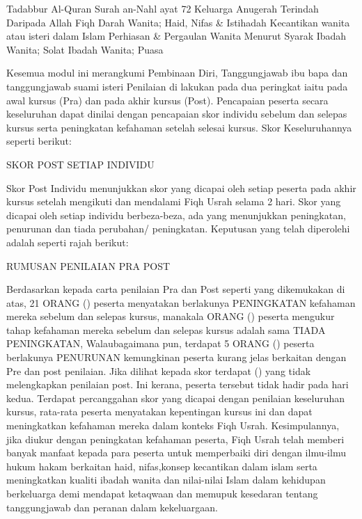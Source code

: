 Tadabbur Al-Quran Surah an-Nahl ayat 72
Keluarga Anugerah Terindah Daripada Allah
Fiqh Darah Wanita; Haid, Nifas & Istihadah
Kecantikan wanita atau isteri dalam Islam
Perhiasan & Pergaulan Wanita Menurut Syarak
Ibadah Wanita; Solat
Ibadah Wanita; Puasa



Kesemua modul ini merangkumi Pembinaan Diri, Tanggungjawab ibu bapa dan tanggungjawab suami isteri Penilaian di lakukan pada dua peringkat iaitu pada awal kursus (Pra) dan pada akhir kursus (Post). Pencapaian peserta secara keseluruhan dapat dinilai dengan pencapaian skor individu sebelum dan selepas kursus serta peningkatan kefahaman setelah selesai kursus. Skor Keseluruhannya seperti berikut:


SKOR POST SETIAP INDIVIDU

Skor Post Individu menunjukkan skor yang dicapai oleh setiap peserta pada akhir kursus setelah mengikuti dan mendalami Fiqh Usrah selama 2 hari. Skor yang dicapai oleh setiap individu berbeza-beza, ada yang menunjukkan peningkatan, penurunan dan tiada perubahan/ peningkatan. Keputusan yang telah diperolehi adalah seperti rajah berikut:





RUMUSAN PENILAIAN PRA POST



Berdasarkan kepada carta penilaian Pra dan Post seperti yang dikemukakan di atas, 21 ORANG () peserta menyatakan berlakunya PENINGKATAN kefahaman mereka sebelum dan selepas kursus, manakala  ORANG () peserta mengukur tahap kefahaman mereka sebelum dan selepas kursus adalah sama TIADA PENINGKATAN, Walaubagaimana pun, terdapat 5 ORANG () peserta berlakunya PENURUNAN kemungkinan peserta kurang jelas berkaitan dengan Pre dan post penilaian. Jika dilihat kepada skor terdapat  () yang tidak melengkapkan penilaian post. Ini kerana, peserta tersebut tidak hadir pada hari kedua. Terdapat percanggahan skor yang dicapai dengan penilaian keseluruhan kursus, rata-rata peserta menyatakan kepentingan kursus ini dan dapat meningkatkan kefahaman mereka dalam konteks Fiqh Usrah.
Kesimpulannya, jika diukur dengan peningkatan kefahaman peserta, Fiqh Usrah telah memberi banyak manfaat kepada para peserta untuk memperbaiki diri dengan ilmu-ilmu hukum hakam berkaitan haid, nifas,konsep kecantikan dalam islam serta meningkatkan kualiti ibadah wanita dan nilai-nilai Islam dalam kehidupan berkeluarga demi mendapat ketaqwaan dan memupuk kesedaran tentang tanggungjawab dan peranan dalam kekeluargaan.

